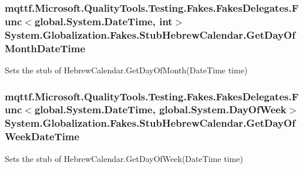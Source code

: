 \hypertarget{class_system_1_1_globalization_1_1_fakes_1_1_stub_hebrew_calendar_a51bbdd58fd126d38eb348c67b59f3d93}{
\subsubsection[{Get\-Day\-Of\-Month\-Date\-Time}]{\setlength{\rightskip}{0pt plus 5cm}mqttf.\-Microsoft.\-Quality\-Tools.\-Testing.\-Fakes.\-Fakes\-Delegates.\-Func$<$global.\-System.\-Date\-Time, int$>$ System.\-Globalization.\-Fakes.\-Stub\-Hebrew\-Calendar.\-Get\-Day\-Of\-Month\-Date\-Time}}\label{class_system_1_1_globalization_1_1_fakes_1_1_stub_hebrew_calendar_a51bbdd58fd126d38eb348c67b59f3d93}


Sets the stub of Hebrew\-Calendar.\-Get\-Day\-Of\-Month(\-Date\-Time time)

\hypertarget{class_system_1_1_globalization_1_1_fakes_1_1_stub_hebrew_calendar_a91e9eefc5912a0199f404c15514649fb}{
\subsubsection[{Get\-Day\-Of\-Week\-Date\-Time}]{\setlength{\rightskip}{0pt plus 5cm}mqttf.\-Microsoft.\-Quality\-Tools.\-Testing.\-Fakes.\-Fakes\-Delegates.\-Func$<$global.\-System.\-Date\-Time, global.\-System.\-Day\-Of\-Week$>$ System.\-Globalization.\-Fakes.\-Stub\-Hebrew\-Calendar.\-Get\-Day\-Of\-Week\-Date\-Time}}\label{class_system_1_1_globalization_1_1_fakes_1_1_stub_hebrew_calendar_a91e9eefc5912a0199f404c15514649fb}


Sets the stub of Hebrew\-Calendar.\-Get\-Day\-Of\-Week(\-Date\-Time time)

